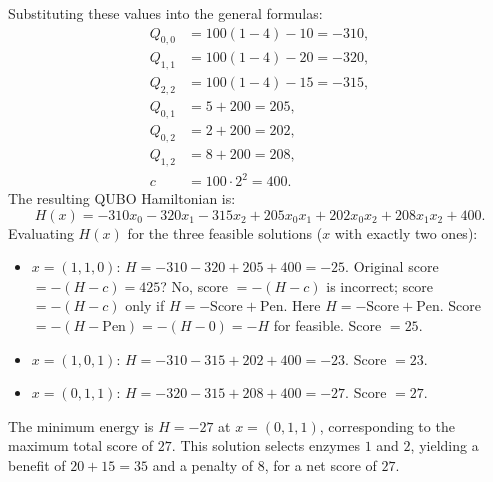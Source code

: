 \documentclass[12pt]{article}
\begin{document}
Substituting these values into the general formulas:
\begin{align}
    Q_{0,0} &= 100(1 - 4) - 10 = -310, \\
    Q_{1,1} &= 100(1 - 4) - 20 = -320, \\
    Q_{2,2} &= 100(1 - 4) - 15 = -315, \\
    Q_{0,1} &= 5 + 200 = 205, \\
    Q_{0,2} &= 2 + 200 = 202, \\
    Q_{1,2} &= 8 + 200 = 208, \\
    c &= 100 \cdot 2^2 = 400.
\end{align}
The resulting QUBO Hamiltonian is:
\begin{equation}
    H(x) = -310 x_0 - 320 x_1 - 315 x_2 + 205 x_0 x_1 + 202 x_0 x_2 + 208 x_1 x_2 + 400.
\end{equation}
Evaluating $H(x)$ for the three feasible solutions ($x$ with exactly two ones):
\begin{itemize}
    \item $x = (1, 1, 0)$: $H = -310 - 320 + 205 + 400 = -25$. Original score $= -(H - c) = 425$? No, score $= -(H - c)$ is incorrect; score $= -(H - c)$ only if $H = -\text{Score} + \text{Pen}$. Here $H = -\text{Score} + \text{Pen}$. Score $= -(H - \text{Pen}) = -(H - 0) = -H$ for feasible. Score $= 25$.
    \item $x = (1, 0, 1)$: $H = -310 - 315 + 202 + 400 = -23$. Score $= 23$.
    \item $x = (0, 1, 1)$: $H = -320 - 315 + 208 + 400 = -27$. Score $= 27$.
\end{itemize}
The minimum energy is $H = -27$ at $x = (0, 1, 1)$, corresponding to the maximum total score of $27$. This solution selects enzymes $1$ and $2$, yielding a benefit of $20 + 15 = 35$ and a penalty of $8$, for a net score of $27$.
\end{document}
